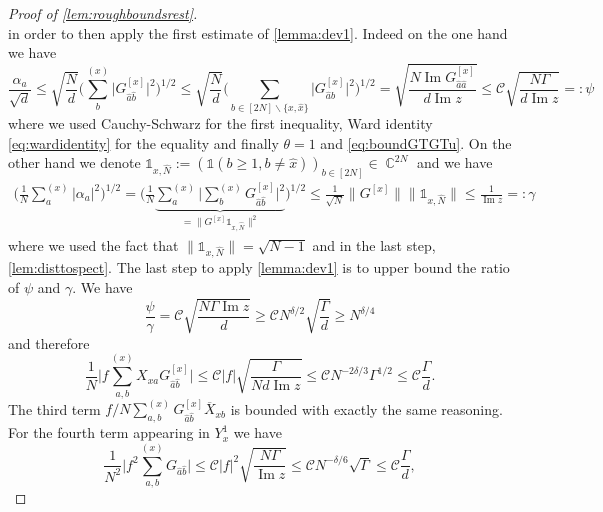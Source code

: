 \documentclass[11pt]{article}
\DeclareMathOperator{\Ima}{Im}
\DeclareMathOperator{\CC}{\mathbb{C}}
\newcommand{\abs}[1]{\left| #1 \right|}
\newcommand{\absb}[1]{\bigl| #1 \bigr|}
\newcommand{\absbb}[1]{\biggl| #1 \biggr|}
\theoremstyle{plain}
\theoremstyle{remark}
\numberwithin{equation}{section}
\newcommand*\barr[1]{\overline{#1}}
\newcommand*\bset[1]{[#1]}
\newcommand*\ubarr[1]{{\widehat{#1}}}
\begin{document}
\begin{proof}[Proof of \cref{lem:roughboundsrest}]
\begin{equation*}
		\end{equation*}
		in order to then apply the first estimate of \cref{lemma:dev1}. Indeed on the one hand we have
		\begin{equation*}
			\frac{\alpha_a}{\sqrt{d}} \le \sqrt{\frac{N}{d}} \biggl( \sum_{b}^{(x)} \absb{G^{\bset{x}}_{\ubarr{a}\ubarr{b}}}^2 \biggr)^{1/2} \le \sqrt{\frac{N}{d}} \biggl( \sum_{b\in [2N] \backslash \{x,\ubarr{x}\}} \absb{G^{\bset{x}}_{\ubarr{a}b}}^2 \biggr)^{1/2} = \sqrt{\frac{N\Ima G^{\bset{x}}_{\ubarr{a}\ubarr{a}}}{d\Ima z}} \le  \mathcal{C}\sqrt{\frac{N \Gamma}{d\Ima z}}=:\psi
		\end{equation*}
		where we used Cauchy-Schwarz for the first inequality, Ward identity \cref{eq:wardidentity} for the equality and finally $\theta=1$ and \cref{eq:boundGTGTu}. On the other hand we denote $ \mathds{1}_{x,\ubarr{N}}:= (\mathds{1}(b \ge 1, b \neq \ubarr{x}))_{b\in [2N]} \in \CC^{2N}$ and we have
		\begin{align*}
			\biggl(\frac{1}{N}\sum_{a}^{(x)} \abs{\alpha_a}^2 \biggr)^{1/2} = \biggl(\frac{1}{N}\underbrace{\sum_{a}^{(x)} \absbb{\sum_{b}^{(x)} G_{\ubarr{a}\ubarr{b}}^{\bset{x}}}^2}_{= \|G^{\bset{x}}\mathds{1}_{x,\ubarr{N}}\|^2} \biggr)^{1/2} \le \frac{1}{\sqrt{N}} \|G^{\bset{x}}\|\|\mathds{1}_{x,\ubarr{N}}\| \le \frac{1}{\Ima z} =: \gamma
		\end{align*}
		where we used the fact that $\|\mathds{1}_{x,\ubarr{N}}\|= \sqrt{N-1}$ and in the last step, \cref{lem:disttospect}. The last step to apply \cref{lemma:dev1} is to upper bound the ratio of $\psi$ and $\gamma$. We have
		\begin{equation*}
			\frac{\psi}{\gamma} = \mathcal{C}\sqrt{\frac{N \Gamma \Ima z }{d}}\ge \mathcal{C}N^{\delta/2}\sqrt{\frac{\Gamma }{d}} \ge N^{\delta/4}
		\end{equation*}
		and therefore
		\begin{equation}\label{eq:bounddoublesum}
			\frac{1}{N} \absbb{ f\sum_{a,b}^{(x)} X_{xa} G^{\bset{x}}_{\ubarr{a}\ubarr{b}}} \le  \mathcal{C}\abs{ f}\sqrt{\frac{\Gamma}{Nd\Ima z}}\le \mathcal{C}N^{-2\delta/3}\Gamma^{1/2}\le \mathcal C \frac{\Gamma}{d}.
		\end{equation}
		The third term $f/N\sum_{a,b}^{(x)} G_{\ubarr{a}\ubarr{b}}^{\bset{x}} \barr{X}_{xb}$ is bounded with exactly the same reasoning. For the fourth term appearing in $Y^{1}_{x}$ we have
		\begin{equation}\label{eq:upboundforfsquare}
			\frac{1}{N^2 }\absbb{f^2\sum_{a,b}^{(x)} G_{\ubarr{a}\ubarr{b}}} \le  \mathcal{C} \abs{f}^2 \sqrt{ \frac{N \Gamma}{ \Ima z}} \le \mathcal{C} N^{-\delta/6} \sqrt{\Gamma} \le \mathcal{C}\frac{\Gamma}{d},

\end{equation}
\end{proof}
\end{document}
